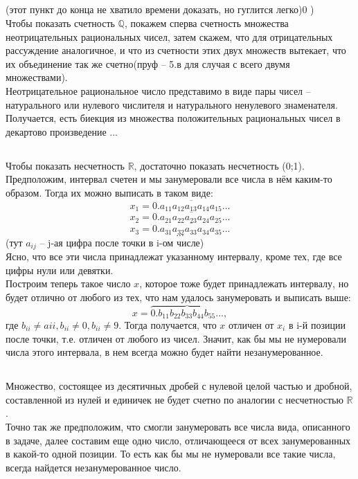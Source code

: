 \subsection{}
(этот пункт до конца не хватило времени доказать, но гуглится легко)0 )\\
Чтобы показать счетность $\mathbb{Q}$, покажем сперва счетность множества неотрицательных рациональных чисел, затем скажем, что для отрицательных рассуждение аналогичное, и что из счетности этих двух множеств вытекает, что их объединение так же счетно(пруф -- 5.в для случая с всего двумя множествами).\\
Неотрицательное рациональное число представимо в виде пары чисел -- натурального или нулевого числителя и натурального ненулевого знаменателя. Получается, есть биекция из множества положительных рациональных чисел в декартово произведение ...
\subsection{}
Чтобы показать несчетность $\mathbb{R}$, достаточно показать несчетность (0;1).\\
Предположим, интервал счетен и мы занумеровали все числа в нём каким-то образом. Тогда их можно выписать в таком виде:\\
$$x_1 = \overline{0.a_{11}a_{12}a_{13}a_{14}a_{15}...}$$
$$x_2 = \overline{0.a_{21}a_{22}a_{23}a_{24}a_{25}...}$$
$$x_3 = \overline{0.a_{31}a_{32}a_{33}a_{34}a_{35}...}$$
$$...$$
(тут $a_{ij}$ -- j-ая цифра после точки в i-ом числе)\\
Ясно, что все эти числа принадлежат указанному интервалу, кроме тех, где все цифры нули или девятки.\\
Построим теперь такое число $x$, которое тоже будет принадлежать интервалу, но будет отлично от любого из тех, что нам удалось занумеровать и выписать выше:
$$x = \overbrace{0.b_{11}b_{22}b_{33}b_{44}b_{55}...},$$
где $b_{ii} \neq a{ii}, b_{ii} \neq 0, b_{ii} \neq 9$. Тогда получается, что $x$ отличен от $x_i$ в i-й позиции после точки, т.е. отличен от любого из чисел. Значит, как бы мы не нумеровали числа этого интервала, в нем всегда можно будет найти незанумерованное.
\subsection{}
Множество, состоящее из десятичных дробей с нулевой целой частью и дробной, составленной из нулей и единичек не будет счетно по аналогии с несчетностью $\mathbb{R}$.\\
Точно так же предположим, что смогли занумеровать все числа вида, описанного в задаче, далее составим еще одно число, отличающееся от всех занумерованных в какой-то одной позиции. То есть как бы мы не нумеровали все такие числа, всегда найдется незанумерованное число.
